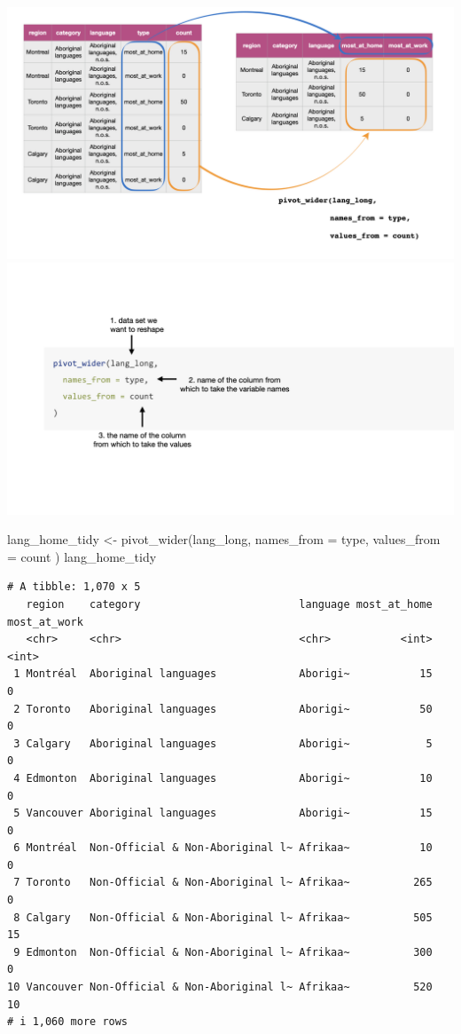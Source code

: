 \documentclass[
  letterpaper,
  DIV=11,
  numbers=noendperiod]{scrartcl}
\newenvironment{Shaded}{\begin{snugshade}}{\end{snugshade}}
\newcommand{\AttributeTok}[1]{\textcolor[rgb]{0.40,0.45,0.13}{#1}}
\newcommand{\FunctionTok}[1]{\textcolor[rgb]{0.28,0.35,0.67}{#1}}
\newcommand{\NormalTok}[1]{\textcolor[rgb]{0.00,0.23,0.31}{#1}}
\newcommand{\OtherTok}[1]{\textcolor[rgb]{0.00,0.23,0.31}{#1}}
\begin{document}
\includegraphics{118_J_pivoting_Notes_files/mediabag/pivot_functions.004.jpg}
\includegraphics{118_J_pivoting_Notes_files/mediabag/pivot_wider.jpg}

\begin{Shaded}
\begin{Highlighting}[]
\NormalTok{lang\_home\_tidy }\OtherTok{\textless{}{-}} \FunctionTok{pivot\_wider}\NormalTok{(lang\_long,}
  \AttributeTok{names\_from =}\NormalTok{ type,}
  \AttributeTok{values\_from =}\NormalTok{ count}
\NormalTok{)}
\NormalTok{lang\_home\_tidy}
\end{Highlighting}
\end{Shaded}

\begin{verbatim}
# A tibble: 1,070 x 5
   region    category                         language most_at_home most_at_work
   <chr>     <chr>                            <chr>           <int>        <int>
 1 Montréal  Aboriginal languages             Aborigi~           15            0
 2 Toronto   Aboriginal languages             Aborigi~           50            0
 3 Calgary   Aboriginal languages             Aborigi~            5            0
 4 Edmonton  Aboriginal languages             Aborigi~           10            0
 5 Vancouver Aboriginal languages             Aborigi~           15            0
 6 Montréal  Non-Official & Non-Aboriginal l~ Afrikaa~           10            0
 7 Toronto   Non-Official & Non-Aboriginal l~ Afrikaa~          265            0
 8 Calgary   Non-Official & Non-Aboriginal l~ Afrikaa~          505           15
 9 Edmonton  Non-Official & Non-Aboriginal l~ Afrikaa~          300            0
10 Vancouver Non-Official & Non-Aboriginal l~ Afrikaa~          520           10
# i 1,060 more rows
\end{verbatim}
\end{document}
